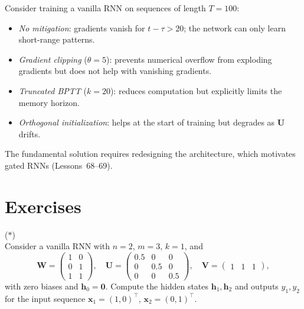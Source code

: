\documentclass[11pt,a4paper]{article}
\begin{document}
\begin{example}
\label{ex:mitigation-compare}
Consider training a vanilla RNN on sequences of length $T = 100$:
\begin{itemize}[nosep]
  \item \emph{No mitigation}: gradients vanish for $t - \tau > 20$;
    the network can only learn short-range patterns.
  \item \emph{Gradient clipping} ($\theta = 5$): prevents numerical
    overflow from exploding gradients but does not help with vanishing
    gradients.
  \item \emph{Truncated BPTT} ($k = 20$): reduces computation but
    explicitly limits the memory horizon.
  \item \emph{Orthogonal initialization}: helps at the start of
    training but degrades as $\mathbf{U}$ drifts.
\end{itemize}
The fundamental solution requires redesigning the architecture, which
motivates gated RNNs (Lessons~68--69).
\end{example}

\section{Exercises}
\label{sec:exercises}

\begin{exercise}
\textnormal{(\(\ast\))} \\
Consider a vanilla RNN with $n = 2$, $m = 3$, $k = 1$, and
\[
  \mathbf{W} = \begin{pmatrix} 1 & 0 \\ 0 & 1 \\ 1 & 1
    \end{pmatrix}, \quad
  \mathbf{U} = \begin{pmatrix} 0.5 & 0 & 0 \\ 0 & 0.5 & 0 \\
    0 & 0 & 0.5 \end{pmatrix}, \quad
  \mathbf{V} = \begin{pmatrix} 1 & 1 & 1 \end{pmatrix},
\]
with zero biases and $\mathbf{h}_0 = \mathbf{0}$.  Compute the
hidden states $\mathbf{h}_1, \mathbf{h}_2$ and outputs
$y_1, y_2$ for the input sequence
$\mathbf{x}_1 = (1, 0)^\top$, $\mathbf{x}_2 = (0, 1)^\top$.
\end{exercise}
\end{document}
